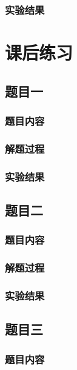 \documentclass[11pt,a4paper]{ctexart}
\begin{document}
\subsubsection{实验结果}
\mbox{}

\section{课后练习}

\subsection{题目一}
\subsubsection{题目内容}
\mbox{}

\subsubsection{解题过程}
\mbox{}

\subsubsection{实验结果}
\mbox{}

\subsection{题目二}
\subsubsection{题目内容}
\mbox{}

\subsubsection{解题过程}
\mbox{}

\subsubsection{实验结果}
\mbox{}

\subsection{题目三}
\subsubsection{题目内容}
\mbox{}
\end{document}
